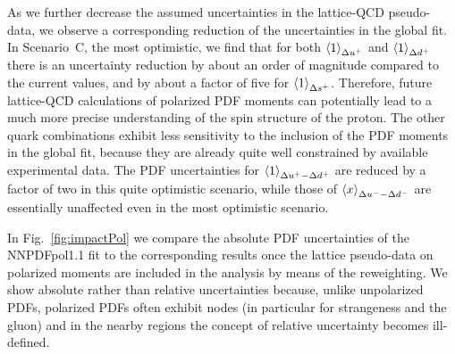 As we further decrease the assumed uncertainties in the lattice-QCD
pseudo-data, we observe a corresponding reduction of the uncertainties
in the global fit.
%
In Scenario~C, the most optimistic, we find that for both
$\left\langle 1\right\rangle_{\Delta u^+}$ and $\left\langle 1\right\rangle_{\Delta d^+}$ there is an uncertainty
reduction by about an order of magnitude compared to the current values,
and by about a factor of five for $\left\langle 1\right\rangle_{\Delta s^+}$.
%
Therefore, future lattice-QCD calculations of
polarized PDF moments can potentially lead to a much more
precise understanding of the spin structure of the proton.
%
The other quark combinations exhibit less sensitivity to the inclusion
of the PDF moments in the global fit, because
they are already quite well constrained by available experimental
data.
%
The PDF uncertainties for  $\left\langle 1\right\rangle_{\Delta u^+ - \Delta d^+}$
are reduced by a factor of two in this quite optimistic scenario, while
those of $\left\langle x\right\rangle_{\Delta u^--\Delta d^-}$ are essentially unaffected even
in the most optimistic scenario.

In Fig.~\ref{fig:impactPol} we compare the absolute PDF uncertainties
of the NNPDFpol1.1 fit to the corresponding results once the lattice 
pseudo-data on polarized moments are included in the analysis by means of the
reweighting.
%
We show absolute rather than relative uncertainties
because, unlike unpolarized PDFs, polarized PDFs often exhibit nodes
(in particular for strangeness and the gluon) and in the nearby regions
the concept of relative uncertainty becomes ill-defined.
  
